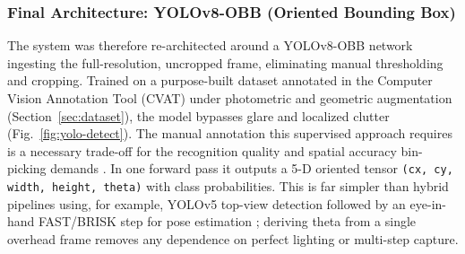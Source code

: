 \documentclass[conference]{IEEEtran}
\begin{document}
\subsubsection{Final Architecture: YOLOv8-OBB (Oriented Bounding Box)}
The system was therefore re-architected around a YOLOv8-OBB network ingesting the full-resolution, uncropped frame, eliminating manual thresholding and cropping. Trained on a purpose-built dataset annotated in the Computer Vision Annotation Tool (CVAT) under photometric and geometric augmentation (Section~\ref{sec:dataset}), the model bypasses glare and localized clutter (Fig.~\ref{fig:yolo-detect}). The manual annotation this supervised approach requires is a necessary trade-off for the recognition quality and spatial accuracy bin-picking demands \cite{Fager}. In one forward pass it outputs a 5-D oriented tensor \texttt{(cx, cy, width, height, theta)} with class probabilities. This is far simpler than hybrid pipelines using, for example, YOLOv5 top-view detection followed by an eye-in-hand FAST/BRISK step for pose estimation \cite{Taweesoontorn}; deriving theta from a single overhead frame removes any dependence on perfect lighting or multi-step capture.
\end{document}
